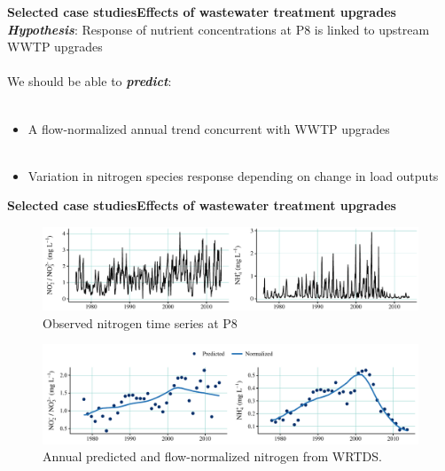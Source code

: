 \documentclass[serif]{beamer}\usepackage[]{graphicx}\usepackage[]{color}
\newcommand{\emtxt}[1]{\textbf{\textit{#1}}}
\begin{document}
\begin{frame}{\textbf{Selected case studies}}{\textbf{Effects of wastewater treatment upgrades}}
\emtxt{Hypothesis}: Response of nutrient concentrations at P8 is linked to upstream WWTP upgrades \\~\\
We should be able to \emtxt{predict}: \\~\\
\begin{itemize}
\item A flow-normalized annual trend concurrent with WWTP upgrades \\~\\
\item Variation in nitrogen species response depending on change in load outputs
\end{itemize}
\end{frame}



\begin{frame}{\textbf{Selected case studies}}{\textbf{Effects of wastewater treatment upgrades}}
\onslide<+->
\begin{figure}
\centerline{\includegraphics[width = \textwidth]{fig/p8obs.pdf}}
\caption{Observed nitrogen time series at P8}
\end{figure}
\onslide<+->
\vspace{-0.35in}
\begin{figure}
\centerline{\includegraphics[width = \textwidth]{fig/p8prdnrm.pdf}}
\caption{Annual predicted and flow-normalized nitrogen from WRTDS.}
\end{figure}
\end{frame}
\end{document}
